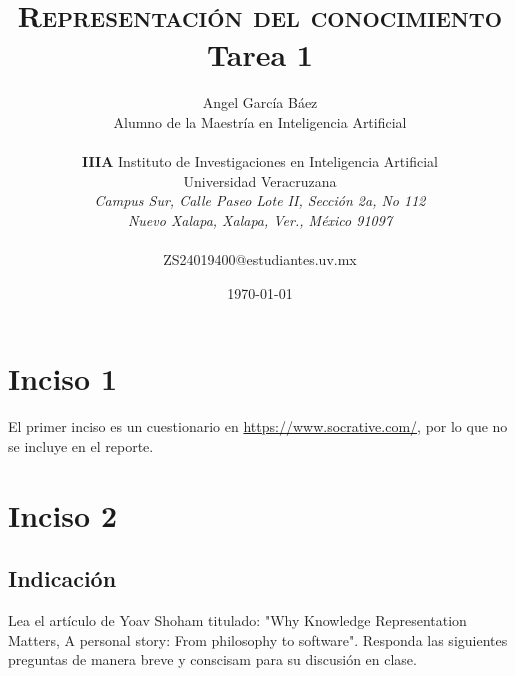 \documentclass[11pt, letterpaper]{article}
\title{\textsc{Representación del conocimiento} \\
	Tarea 1
}
\author{Angel García Báez\\
	Alumno de la Maestría en Inteligencia Artificial \\ \\ \textbf{IIIA}
	Instituto de Investigaciones en Inteligencia Artificial \\
	Universidad Veracruzana \\ \emph{Campus Sur, Calle Paseo Lote II,
		Sección 2a, No 112} \\ \emph{Nuevo Xalapa, Xalapa, Ver., México 91097}
	\\ \\ ZS24019400@estudiantes.uv.mx}
\date{\today}
\begin{document}
	
	\maketitle
	\section{Inciso 1}
	
	El primer inciso es un cuestionario en \url{https://www.socrative.com/}, por lo que no se incluye en el reporte. 
	
	\section{Inciso 2}
	\subsection{Indicación}
	Lea el artículo de Yoav Shoham titulado: "Why Knowledge Representation Matters, A personal story: From philosophy to software". Responda las siguientes preguntas de manera breve y conscisam para su discusión en clase.
	
\end{document}
